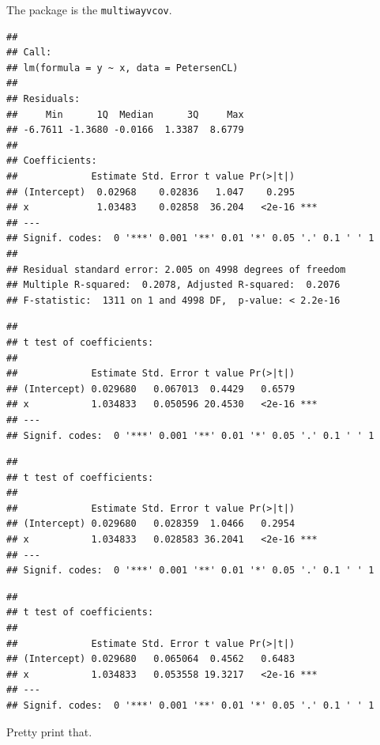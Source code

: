 \documentclass[
]{book}
\begin{document}
The package is the \texttt{multiwayvcov}.

\begin{verbatim}
## 
## Call:
## lm(formula = y ~ x, data = PetersenCL)
## 
## Residuals:
##     Min      1Q  Median      3Q     Max 
## -6.7611 -1.3680 -0.0166  1.3387  8.6779 
## 
## Coefficients:
##             Estimate Std. Error t value Pr(>|t|)    
## (Intercept)  0.02968    0.02836   1.047    0.295    
## x            1.03483    0.02858  36.204   <2e-16 ***
## ---
## Signif. codes:  0 '***' 0.001 '**' 0.01 '*' 0.05 '.' 0.1 ' ' 1
## 
## Residual standard error: 2.005 on 4998 degrees of freedom
## Multiple R-squared:  0.2078, Adjusted R-squared:  0.2076 
## F-statistic:  1311 on 1 and 4998 DF,  p-value: < 2.2e-16
\end{verbatim}

\begin{verbatim}
## 
## t test of coefficients:
## 
##             Estimate Std. Error t value Pr(>|t|)    
## (Intercept) 0.029680   0.067013  0.4429   0.6579    
## x           1.034833   0.050596 20.4530   <2e-16 ***
## ---
## Signif. codes:  0 '***' 0.001 '**' 0.01 '*' 0.05 '.' 0.1 ' ' 1
\end{verbatim}

\begin{verbatim}
## 
## t test of coefficients:
## 
##             Estimate Std. Error t value Pr(>|t|)    
## (Intercept) 0.029680   0.028359  1.0466   0.2954    
## x           1.034833   0.028583 36.2041   <2e-16 ***
## ---
## Signif. codes:  0 '***' 0.001 '**' 0.01 '*' 0.05 '.' 0.1 ' ' 1
\end{verbatim}

\begin{verbatim}
## 
## t test of coefficients:
## 
##             Estimate Std. Error t value Pr(>|t|)    
## (Intercept) 0.029680   0.065064  0.4562   0.6483    
## x           1.034833   0.053558 19.3217   <2e-16 ***
## ---
## Signif. codes:  0 '***' 0.001 '**' 0.01 '*' 0.05 '.' 0.1 ' ' 1
\end{verbatim}

Pretty print that.
\end{document}
